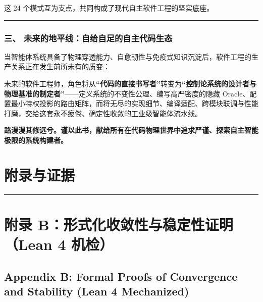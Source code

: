 \documentclass[
]{ctexart}
\renewcommand{\_}{\discretionary{}{}{\textunderscore}}
\let\oldsection\section
\renewcommand{\section}{\clearpage\oldsection}
\begin{document}
这 24 个模式互为支点，共同构成了现代自主软件工程的坚实底座。

\begin{center}\rule{0.5\linewidth}{0.5pt}\end{center}

\subsubsection{三、
未来的地平线：自给自足的自主代码生态}\label{ux4e09-ux672aux6765ux7684ux5730ux5e73ux7ebfux81eaux7ed9ux81eaux8db3ux7684ux81eaux4e3bux4ee3ux7801ux751fux6001}

当智能体系统具备了物理穿透能力、自愈韧性与免疫式知识沉淀后，软件工程的生产关系正在发生前所未有的质变：

未来的软件工程师，角色将从\textbf{``代码的直接书写者''}转变为\textbf{``控制论系统的设计者与物理基准的制定者''}------定义系统的不变性公理、编写高严密度的隐藏
Oracle、配置最小特权投影的路由矩阵，而将无尽的实现细节、编译适配、跨模块联调与性能打磨，交给这套永不疲倦、确定性收敛的工业级智能体流水线。

\textbf{路漫漫其修远兮。谨以此书，献给所有在代码物理世界中追求严谨、探索自主智能极限的系统构建者。}

\section{附录与证据}\label{ux9644ux5f55ux4e0eux8bc1ux636e}

\begin{center}\rule{0.5\linewidth}{0.5pt}\end{center}

\section{附录 B：形式化收敛性与稳定性证明（Lean 4
机检）}\label{ux9644ux5f55-bux5f62ux5f0fux5316ux6536ux655bux6027ux4e0eux7a33ux5b9aux6027ux8bc1ux660elean-4-ux673aux68c0}

\subsection{Appendix B: Formal Proofs of Convergence and Stability (Lean
4
Mechanized)}\label{appendix-b-formal-proofs-of-convergence-and-stability-lean-4-mechanized}
\end{document}
